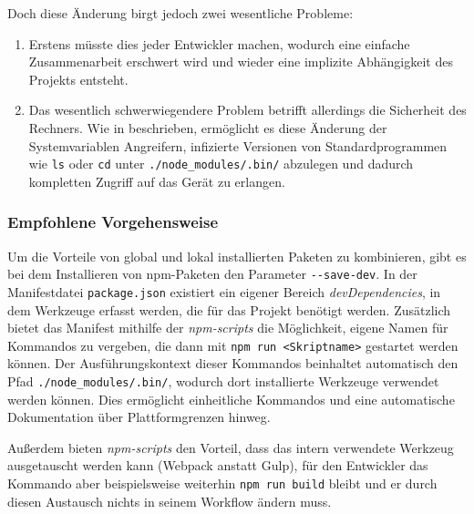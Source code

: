 \begin{enumerate}
    Doch diese Änderung birgt jedoch zwei wesentliche Probleme:
    \begin{enumerate}
        \item Erstens müsste dies jeder Entwickler machen, wodurch eine einfache Zusammenarbeit erschwert wird und wieder eine implizite Abhängigkeit des Projekts entsteht.
        \item Das wesentlich schwerwiegendere Problem betrifft allerdings die Sicherheit des Rechners.
        Wie in \autocite{stackoverflow:nodemodules-hack:online} beschrieben, ermöglicht es diese Änderung der Systemvariablen Angreifern, infizierte Versionen von Standardprogrammen wie \verb|ls| oder \verb|cd| unter \verb|./node_modules/.bin/| abzulegen und dadurch kompletten Zugriff auf das Gerät zu erlangen.
    \end{enumerate}
\end{enumerate}



\subsubsection{Empfohlene Vorgehensweise}
\label{subsub:packages-best-practice}
Um die Vorteile von global und lokal installierten Paketen zu kombinieren, gibt es bei dem Installieren von npm-Paketen den Parameter \verb|--save-dev|.
In der Manifestdatei \verb|package.json| existiert ein eigener Bereich \emph{devDependencies}, in dem Werkzeuge erfasst werden, die für das Projekt benötigt werden.
Zusätzlich bietet das Manifest mithilfe der \emph{npm-scripts} die Möglichkeit, eigene Namen für Kommandos zu vergeben, die dann mit \verb|npm run <Skriptname>| gestartet werden können.
Der Ausführungskontext dieser Kommandos beinhaltet automatisch den Pfad \verb|./node_modules/.bin/|, wodurch dort installierte Werkzeuge verwendet werden können.
Dies ermöglicht einheitliche Kommandos und eine automatische Dokumentation über Plattformgrenzen hinweg.

Außerdem bieten \emph{npm-scripts} den Vorteil, dass das intern verwendete Werkzeug ausgetauscht werden kann (\zB Webpack anstatt Gulp), für den Entwickler das Kommando aber beispielsweise weiterhin \verb|npm run build| bleibt und er durch diesen Austausch nichts in seinem Workflow ändern muss.
